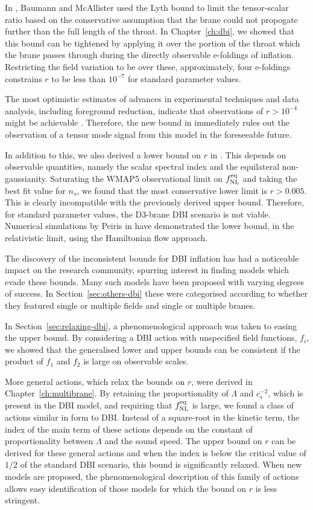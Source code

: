 In , Baumann and McAllister used the Lyth bound \cite{lyth} to limit
the tensor-scalar ratio based on the conservative assumption that the brane could
not propogate further than the full length of the throat. In Chapter~\ref{ch:dbi},
we showed that this bound can be tightened by applying it over the
portion of the throat which the brane passes through during the directly observable
e-foldings of inflation. Restricting the field variation to be over these,
approximately, four e-foldings constrains $r$ to be less than $10^{-7}$ for standard
parameter values.

The most optimistic estimates of advances in experimental techniques and data
analysis, including foreground reduction, indicate that observations of $r>10^{-4}$
might be achievable \cite{Baumann:2008aq,vpj}. Therefore, the new bound in
 immediately rules out the observation of a tensor mode signal
from this model in the foreseeable future.

In addition to this, we also derived a lower bound on $r$ in .
This depends on observable quantities, namely the scalar spectral index and the
equilateral non-gaussianity. Saturating the WMAP5 observational limit on $f_{\mathrm{NL}}^{\mathrm{eq}}$
and taking the best fit value for $n_s$, we found that the most conservative lower
limit is $r>0.005$. This is clearly incompatible with the previously derived upper
bound. Therefore, for standard parameter values, the D3-brane DBI scenario is not
viable. Numerical simulations by Peiris \etal in  have
demonstrated the lower bound, in the relativistic limit, using the
Hamiltonian flow approach.

The discovery of the inconsistent bounds for DBI inflation has had a noticeable
impact on the research community, spurring interest in finding models which evade
these bounds. Many such models have been proposed with varying degrees of success. In
Section~\ref{sec:others-dbi} these were categorised according to whether they
featured single or multiple fields and single or multiple branes. 

In Section~\ref{sec:relaxing-dbi}, a phenomenological approach was taken to easing
the upper bound. By considering a DBI action with unspecified field functions,
$f_i$, we showed that the generalised lower and upper bounds can be consistent
if the product of $f_1$ and $f_2$ is large on observable scales.


More general actions, which relax the bounds on $r$, were derived in
Chapter~\ref{ch:multibrane}. By retaining the proportionality of $\Lambda$ and
$c_s^{-2}$, which is present in the DBI model, and requiring that $f_{\mathrm{NL}}^{\mathrm{eq}}$ is large,
we found a class of actions similar in form to DBI. 
Instead of a square-root in the kinetic term, the index of the main term of these
actions depends on the constant of proportionality between $\Lambda$ and the sound
speed.
The upper bound on $r$ can be derived for these general actions and when the index
is below the critical value of $1/2$ of the standard DBI scenario, this bound is
significantly relaxed. When new models are proposed, the
phenomenological description of this family of actions allows easy identification of
those models for which the bound on $r$ is less stringent. 

